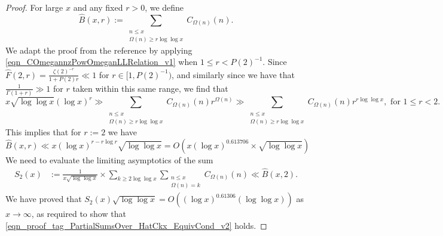 \documentclass[11pt,reqno,a4letter]{article}
\numberwithin{figure}{section}
\numberwithin{table}{section}
\newcommand{\cf}{\textit{cf.\ }}
\theoremstyle{plain}
\numberwithin{theorem}{section}
\theoremstyle{definition}
\begin{document}
\begin{proof}
For large $x$ and any fixed $r > 0$, we define 
\[
\widehat{B}(x, r) := \sum_{\substack{n \leq x \\ \Omega(n) \geq r\log\log x}} 
     C_{\Omega(n)}(n). 
\]
We adapt the proof from the reference \cite[\cf Thm.\ 7.20; \S 7.4]{MV} by 
applying \eqref{eqn_COmegannzPowOmeganLLRelation_v1} when $1 \leq r < P(2)^{-1}$. 
Since $\widehat{F}(2, r) = \frac{\zeta(2)^{-r}}{1+P(2)r} \ll 1$ for $r \in [1, P(2)^{-1})$, and 
similarly since we have that $\frac{1}{\Gamma(1+r)} \gg 1$ for $r$ taken within this same range, 
we find that 
\[
x \sqrt{\log\log x} (\log x)^{r} \gg \sum_{\substack{n \leq x \\ \Omega(n) \geq r\log\log x}} 
     C_{\Omega(n)}(n) r^{\Omega(n)} \gg 
     \sum_{\substack{n \leq x \\ \Omega(n) \geq r\log\log x}} 
     C_{\Omega(n)}(n) r^{r \log\log x}, \text{\ for\ } 1 \leq r < 2. 
\]
This implies that for $r := 2$ we have 
\begin{equation}
\label{eqn_BHatxrUpperBound_v1}
\widehat{B}(x, r) \ll x (\log x)^{r-r\log r} \sqrt{\log\log x} = 
     O\left(x (\log x)^{0.613706} \times \sqrt{\log\log x}\right)
\end{equation}
We need to evaluate the limiting asymptotics of the sum 
\begin{align*}
S_2(x) & := \frac{1}{x \sqrt{\log\log x}} \times 
     \sum_{k \geq 2\log\log x} \sum_{\substack{n \leq x \\ \Omega(n)=k}} 
     C_{\Omega(n)}(n) \ll \widehat{B}(x, 2). 
\end{align*} 
We have proved that 
$S_2(x) \sqrt{\log\log x} = O\left((\log x)^{0.61306} (\log\log x)\right)$ 
as $x \rightarrow \infty$, as required to show that 
\eqref{eqn_proof_tag_PartialSumsOver_HatCkx_EquivCond_v2} holds. 
\end{proof} 
\end{document}
